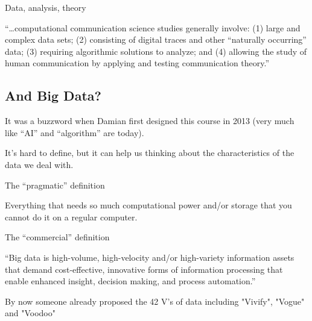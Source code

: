 \begin{frame}{Data, analysis, theory}
	\begin{block}{\textcite{VanAtteveldt2018a}}
		``\ldots computational communication science studies generally involve: (1) large and complex data sets; (2) consisting of digital traces and other ``naturally occurring'' data; (3) requiring algorithmic solutions to analyze; and (4) allowing the study of human communication by applying and testing communication theory.''
	\end{block}	
	
\end{frame}





\subsection{And Big Data?}

\begin{frame}[standout]
It was a buzzword when Damian first designed this course in 2013 (very much like ``AI'' and ``algorithm'' are today).

It's hard to define, but it can help us thinking about the characteristics of the data we deal with.
\end{frame}


\begin{frame}{The ``pragmatic'' definition }
	\begin{block}{}
		Everything that needs so much computational power and/or storage that you cannot do it on a regular computer.
	\end{block}
\end{frame}



\begin{frame}{The ``commercial'' definition }
	\begin{block}{\textcite{gartner}}
		``Big data is high-volume, high-velocity and/or high-variety information assets that demand cost-effective, innovative forms of information processing that enable enhanced insight, decision making, and process automation.''
	\end{block}
	By now someone already proposed the 42 V's of data including "Vivify", "Vogue" and "Voodoo"
\end{frame}



